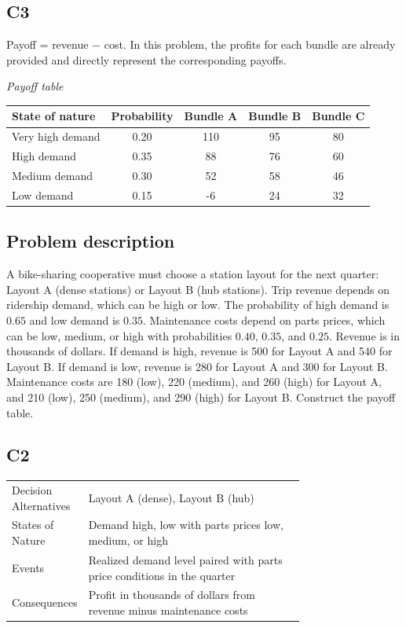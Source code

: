 \begin{ExamProblems}
		\subsection*{C3}
		Payoff = revenue $-$ cost. In this problem, the profits for each bundle are already provided and directly represent the corresponding payoffs.
		\begin{center}
			\textit{Payoff table} \\
			\begin{tabular}{l c c c c}
				\toprule
				State of nature & Probability & Bundle A & Bundle B & Bundle C \\
				\midrule
				Very high demand & 0.20 & 110 & 95 & 80 \\
				High demand & 0.35 & 88 & 76 & 60 \\
				Medium demand & 0.30 & 52 & 58 & 46 \\
				Low demand & 0.15 & -6 & 24 & 32 \\
				\bottomrule
			\end{tabular}
		\end{center}
		
		\item
		\subsection*{Problem description}
		A bike-sharing cooperative must choose a station layout for the next quarter: Layout A (dense stations)
		or Layout B (hub stations). Trip revenue depends on ridership demand, which can be high or low.
		The probability of high demand is $0.65$ and low demand is $0.35$. Maintenance costs depend on parts prices,
		which can be low, medium, or high with probabilities $0.40$, $0.35$, and $0.25$. Revenue is in thousands of dollars.
		If demand is high, revenue is 500 for Layout A and 540 for Layout B. If demand is low, revenue is 280 for Layout A
		and 300 for Layout B. Maintenance costs are 180 (low), 220 (medium), and 260 (high) for Layout A, and 210 (low),
		250 (medium), and 290 (high) for Layout B. Construct the payoff table.
		
		\subsection*{C2}
		\begin{center}
			\begin{tabular}{l p{0.74\linewidth}}
				\toprule
				Decision Alternatives & Layout A (dense), Layout B (hub) \\
				States of Nature & Demand high, low with parts prices low, medium, or high \\
				Events & Realized demand level paired with parts price conditions in the quarter \\
				Consequences & Profit in thousands of dollars from revenue minus maintenance costs \\
				\bottomrule
			\end{tabular}
		\end{center}
		

\end{ExamProblems}
